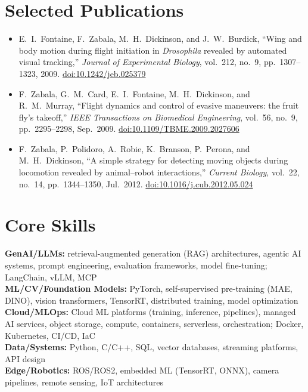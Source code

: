 \documentclass[11pt]{article}
\begin{document}
\section*{Selected Publications}
\begin{itemize}[leftmargin=*, itemsep=0.15em]
\item E.~I.~Fontaine, F.~Zabala, M.~H.~Dickinson, and J.~W.~Burdick, ``Wing and body motion during flight initiation in \emph{Drosophila} revealed by automated visual tracking,'' \emph{Journal of Experimental Biology}, vol.~212, no.~9, pp.~1307--1323, 2009. 
\href{https://doi.org/10.1242/jeb.025379}{doi:10.1242/jeb.025379}
\item F.~Zabala, G.~M.~Card, E.~I.~Fontaine, M.~H.~Dickinson, and R.~M.~Murray, ``Flight dynamics and control of evasive maneuvers: the fruit fly's takeoff,'' \emph{IEEE Transactions on Biomedical Engineering}, vol.~56, no.~9, pp.~2295--2298, Sep.~2009. 
\href{https://doi.org/10.1109/TBME.2009.2027606}{doi:10.1109/TBME.2009.2027606}
\item F.~Zabala, P.~Polidoro, A.~Robie, K.~Branson, P.~Perona, and M.~H.~Dickinson, ``A simple strategy for detecting moving objects during locomotion revealed by animal--robot interactions,'' \emph{Current Biology}, vol.~22, no.~14, pp.~1344--1350, Jul.~2012. 
\href{https://doi.org/10.1016/j.cub.2012.05.024}{doi:10.1016/j.cub.2012.05.024}
\end{itemize}

\section*{Core Skills}
\textbf{GenAI/LLMs:} retrieval-augmented generation (RAG) architectures, agentic AI systems, prompt engineering,
evaluation frameworks, model fine-tuning; LangChain, vLLM, MCP \enspace \\
\textbf{ML/CV/Foundation Models:} PyTorch, self-supervised pre-training (MAE, DINO), vision transformers, TensorRT, distributed training, model optimization \enspace \\
\textbf{Cloud/MLOps:} Cloud ML platforms (training, inference, pipelines), managed AI services, object storage, compute, containers, serverless, orchestration; Docker, Kubernetes, CI/CD, IaC \enspace \\
\textbf{Data/Systems:} Python, C/C++, SQL, vector databases, streaming platforms, API design \enspace \\
\textbf{Edge/Robotics:} ROS/ROS2, embedded ML (TensorRT, ONNX), camera pipelines, remote sensing, IoT architectures
\end{document}
